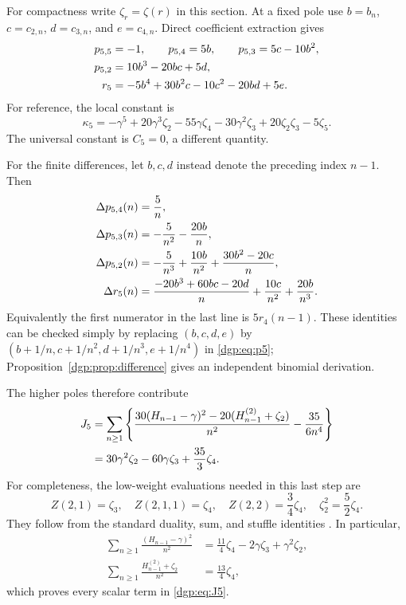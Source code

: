 For compactness write $\zeta_r=\zeta(r)$ in this section.  At a fixed
pole use $b=b_n$, $c=c_{2,n}$, $d=c_{3,n}$, and $e=c_{4,n}$.
Direct coefficient extraction gives
\begin{align}
 p_{5,5}&=-1,\qquad
 p_{5,4}=5b,\qquad
 p_{5,3}=5c-10b^2,\notag\\
 p_{5,2}&=10b^3-20bc+5d,\notag\\
 r_5&=-5b^4+30b^2c-10c^2-20bd+5e.
 \label{dgp:eq:p5}
\end{align}
For reference, the local constant is
\begin{equation}
 \kappa_5=-\gamma^5+20\gamma^3\zeta_2-55\gamma\zeta_4
             -30\gamma^2\zeta_3+20\zeta_2\zeta_3-5\zeta_5.
 \label{dgp:eq:kappa5}
\end{equation}
The universal constant is $C_5=0$, a different quantity.

For the finite differences, let $b,c,d$ instead denote the preceding
index $n-1$.  Then
\begin{align}
 \Delta p_{5,4}(n)&=\frac5n,\notag\\
 \Delta p_{5,3}(n)&=-\frac5{n^2}-\frac{20b}{n},\notag\\
 \Delta p_{5,2}(n)&=-\frac5{n^3}+\frac{10b}{n^2}
                              +\frac{30b^2-20c}{n},\notag\\
 \Delta r_5(n)&=\frac{-20b^3+60bc-20d}{n}
                          +\frac{10c}{n^2}+\frac{20b}{n^3}.
 \label{dgp:eq:delta5}
\end{align}
Equivalently the first numerator in the last line is $5r_4(n-1)$.
These identities can be checked simply by replacing
$(b,c,d,e)$ by $(b+1/n,c+1/n^2,d+1/n^3,e+1/n^4)$ in
\eqref{dgp:eq:p5}; Proposition~\ref{dgp:prop:difference} gives an independent
binomial derivation.

The higher poles therefore contribute
\begin{align}
 J_5
 &=\sum_{n\ge1}\left\{
       \frac{30(H_{n-1}-\gamma)^2
                    -20(H_{n-1}^{(2)}+\zeta_2)}{n^2}
                            -\frac{35}{6n^4}\right\}\notag\\
 &=30\gamma^2\zeta_2-60\gamma\zeta_3+\frac{35}{3}\zeta_4.
 \label{dgp:eq:J5}
\end{align}
For completeness, the low-weight evaluations needed in this last step
are
\[
 Z(2,1)=\zeta_3,\quad Z(2,1,1)=\zeta_4,\quad
 Z(2,2)=\frac34\zeta_4,\quad \zeta_2^2=\frac52\zeta_4.
\]
They follow from the standard duality, sum, and stuffle identities
\cite{dgp:DLMF,dgp:IKZ}.  In particular,
\begin{align*}
 \sum_{n\ge1}\frac{(H_{n-1}-\gamma)^2}{n^2}
       &=\frac{11}{4}\zeta_4-2\gamma\zeta_3+\gamma^2\zeta_2,\\
 \sum_{n\ge1}\frac{H_{n-1}^{(2)}+\zeta_2}{n^2}
       &=\frac{13}{4}\zeta_4,
\end{align*}
which proves every scalar term in \eqref{dgp:eq:J5}.

